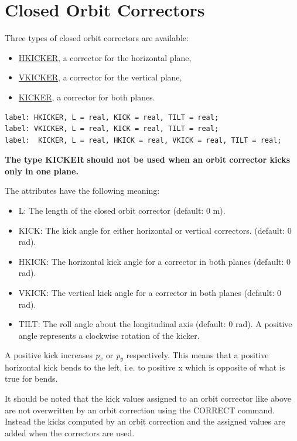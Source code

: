\section{Closed Orbit Correctors}
\label{sec:closed_orbit_cor}
Three types of closed orbit correctors are available: 
\begin{itemize}
   \item \href{hkick}{HKICKER}, a corrector for the horizontal plane, 
   \item \href{vkick}{VKICKER}, a corrector for the vertical plane, 
   \item \href{kick}{KICKER}, a corrector for both planes. 
\end{itemize}

\begin{verbatim}
label: HKICKER, L = real, KICK = real, TILT = real;
label: VKICKER, L = real, KICK = real, TILT = real;
label:  KICKER, L = real, HKICK = real, VKICK = real, TILT = real;
\end{verbatim} 

{\bf The type KICKER should not be used when an orbit corrector kicks
  only in one plane.}  

The attributes have the following meaning: 
\begin{itemize}
   \item L: The length of the closed orbit corrector (default: 0 m). 
   \item KICK: The kick angle for either horizontal or vertical correctors. (default: 0 rad). 
   \item HKICK: The horizontal kick angle for a corrector in both planes (default: 0 rad). 
   \item VKICK: The vertical kick angle for a corrector in both planes (default: 0 rad). 
   \item TILT: The roll angle about the longitudinal axis (default: 0
     rad). A positive angle represents a clockwise rotation of the
     kicker.  
\end{itemize} 

A positive kick increases \textit{p$_x$} or \textit{p$_y$}
respectively. This means that a positive horizontal kick bends to the
left,  i.e. to positive x which is opposite of what is true for bends.   

It should be noted that the kick values assigned to an orbit corrector
like above are not overwritten by an orbit correction using the CORRECT
command. Instead the kicks computed by an orbit correction and the
assigned values are added when the correctors are used.  

